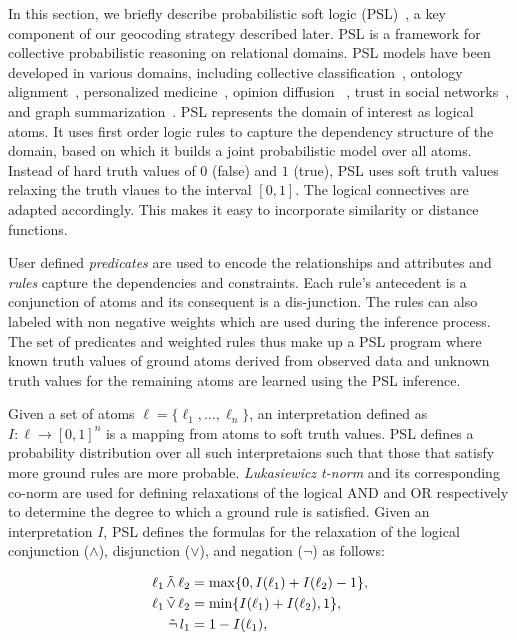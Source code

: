 In this section, we briefly describe probabilistic soft logic (PSL)~\cite{kimmig2012short}, a key
component of our geocoding strategy described later.
PSL is a framework for collective probabilistic reasoning on relational domains.
PSL models have been developed in various domains, including collective classification~\cite{broecheler2010computing}, 
ontology alignment~\cite{brocheler2012probabilistic}, personalized medicine~\cite{bach2010decision}, 
opinion diffusion~\cite{bach2012scaling} , trust in social networks~\cite{huang2012probabilistic}, and graph 
summarization~\cite{memory2012graph}.
PSL represents the domain of interest as logical atoms.
It uses first order logic rules to capture the dependency structure of the domain, based on which it builds a joint probabilistic model over all atoms.
Instead of hard truth values of $0$ (false) and $1$ (true), PSL uses soft truth values relaxing the truth vlaues to the interval $[0,1]$.
The logical connectives are adapted accordingly.
This makes it easy to incorporate similarity or distance functions.

User defined \emph{predicates} are used to encode the relationships and attributes and \emph{rules} capture the  dependencies and constraints.
Each rule's antecedent is a conjunction of atoms and its consequent is a dis-junction. 
The rules can also labeled with non negative weights which are used during the inference process.
The set of predicates and weighted rules thus make up a PSL program where known truth values of ground atoms derived from observed data and unknown truth values for the remaining atoms are learned using the PSL inference.

Given a set of atoms 
$\ell = \{\ell_1,\ldots,\ell_n\}$,
an interpretation defined as 
$I : \ell \rightarrow [0,1]^n$
is a mapping from atoms to soft truth values.
PSL defines a probability distribution over all such interpretaions such that those that satisfy more ground rules are more probable.
\emph{Lukasiewicz t-norm} and its corresponding co-norm are used for defining relaxations of the logical AND and OR respectively to determine the degree to which a ground rule is satisfied.
Given an interpretation $\mathit{I}$, PSL defines the formulas for the relaxation of the logical conjunction ($\wedge$), disjunction ($\vee$), and negation ($\neg$) as follows:

\begin{align*}
\ell_1 \softand \ell_2 &= \max\{0, I(\ell_1) + I(\ell_2) - 1\},\\
\ell_1 \softor \ell_2 &= \min\{I(\ell_1) + I(\ell_2), 1\},\\
\softneg l_1 &= 1 - I(\ell_1),
\end{align*}  

